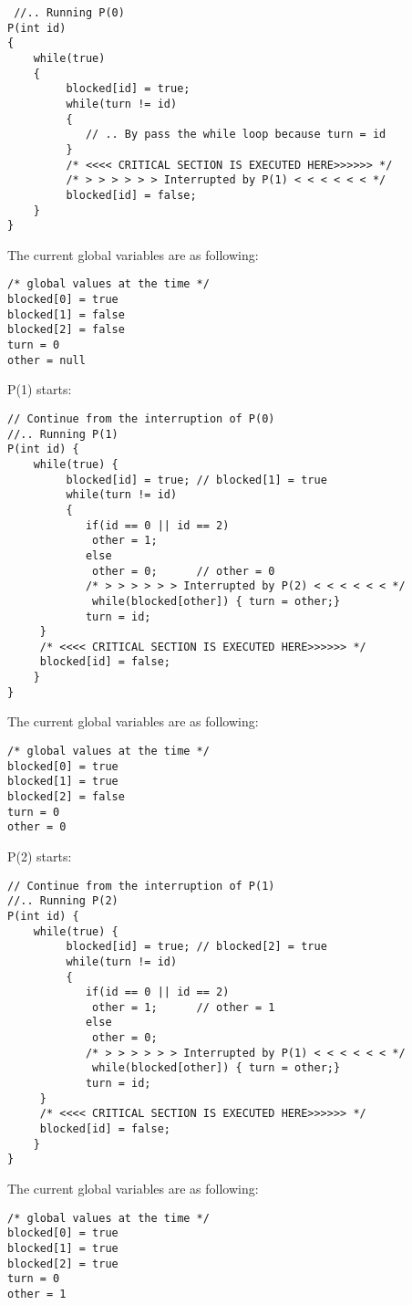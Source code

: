 \begin{lstlisting}
 //.. Running P(0)
P(int id)
{
    while(true)
    {
         blocked[id] = true;
         while(turn != id)
         {
            // .. By pass the while loop because turn = id
         }
         /* <<<< CRITICAL SECTION IS EXECUTED HERE>>>>>> */
         /* > > > > > > Interrupted by P(1) < < < < < < */
         blocked[id] = false;
    }
}
\end{lstlisting}

The current global variables are as following:
\begin{lstlisting}
/* global values at the time */
blocked[0] = true
blocked[1] = false
blocked[2] = false
turn = 0
other = null
\end{lstlisting}

P(1) starts:
\begin{lstlisting}
// Continue from the interruption of P(0)
//.. Running P(1)
P(int id) {
    while(true) {
         blocked[id] = true; // blocked[1] = true
         while(turn != id)
         {
            if(id == 0 || id == 2)
             other = 1;      
            else
             other = 0;      // other = 0
            /* > > > > > > Interrupted by P(2) < < < < < < */
             while(blocked[other]) { turn = other;}  
            turn = id;      
     }
     /* <<<< CRITICAL SECTION IS EXECUTED HERE>>>>>> */
     blocked[id] = false;
    }
}
\end{lstlisting}


The current global variables are as following:
\begin{lstlisting}
/* global values at the time */
blocked[0] = true
blocked[1] = true
blocked[2] = false
turn = 0
other = 0
\end{lstlisting}

P(2) starts:
\begin{lstlisting}
// Continue from the interruption of P(1)
//.. Running P(2)
P(int id) {
    while(true) {
         blocked[id] = true; // blocked[2] = true
         while(turn != id)
         {
            if(id == 0 || id == 2)
             other = 1;      // other = 1
            else
             other = 0;      
            /* > > > > > > Interrupted by P(1) < < < < < < */
             while(blocked[other]) { turn = other;}  
            turn = id;      
     }
     /* <<<< CRITICAL SECTION IS EXECUTED HERE>>>>>> */
     blocked[id] = false;
    }
}
\end{lstlisting}

The current global variables are as following:
\begin{lstlisting}
/* global values at the time */
blocked[0] = true
blocked[1] = true
blocked[2] = true
turn = 0
other = 1
\end{lstlisting}


